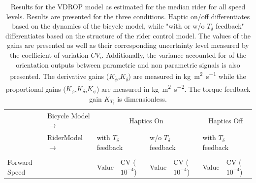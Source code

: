 \begin{table}[]
    \caption{ Results for the VDROP model as estimated for the median rider for all speed levels. Results are presented for the three conditions. Haptic on/off differentiates based on the dynamics of the bicycle model, while "with or w/o \ensuremath{T_\delta} feedback" differentiates based on the structure of the rider control model. The values of the gains are presented as well as their corresponding uncertainty level measured by the coefficient of variation \ensuremath{CV_i}. Additionally, the variance accounted for of the orientation outputs between parametric and non parametric signals is also presented. The derivative gains (\ensuremath{K_{\dot{\phi}}},\ensuremath{K_{\dot{\delta}}}) are measured in \si{\kilogram\square\meter\per\second} while the proportional gains (\ensuremath{K_{\phi}},\ensuremath{K_{\delta}},\ensuremath{K_{\psi}}) are measured in \si{\kilogram\square\meter\per\square\second}. The torque feedback gain \ensuremath{K_{T_\delta}} is dimensionless.}
    \label{tb:predict}
    \begin{tabular}{llcccccc}
    \hline
                                                   &  Bicycle Model\;$\rightarrow$                                  & \multicolumn{4}{c}{Haptics On}                                                                                                                                                                          & \multicolumn{2}{c}{Haptics Off}                                                                    \\ \cline{2-8} 
                                                   & {\color[HTML]{333333} Rider\;\;\;\;Model\;$\rightarrow$} & \multicolumn{2}{l}{with $T_\delta$ feedback}                                                       & \multicolumn{2}{l}{w/o  $T_\delta$ feedback}                                                       & \multicolumn{2}{l}{with $T_\delta$ feedback}                                                       \\ \cline{2-8} 
                                                   &                                                        & \multicolumn{1}{l}{}                        & \multicolumn{1}{l}{}                                 & \multicolumn{1}{l}{}                        & \multicolumn{1}{l}{}                                 & \multicolumn{1}{l}{}                        & \multicolumn{1}{l}{}                                 \\
    \multirow{-2}{*}{Forward Speed}                &                                                        & \multicolumn{1}{l}{\multirow{-2}{*}{Value}} & \multicolumn{1}{l}{\multirow{-2}{*}{CV ($10^{-4}$)}} & \multicolumn{1}{l}{\multirow{-2}{*}{Value}} & \multicolumn{1}{l}{\multirow{-2}{*}{CV ($10^{-4}$)}} & \multicolumn{1}{l}{\multirow{-2}{*}{Value}} & \multicolumn{1}{l}{\multirow{-2}{*}{CV ($10^{-4}$)}} \\ \hline

\end{tabular}
\end{table}
